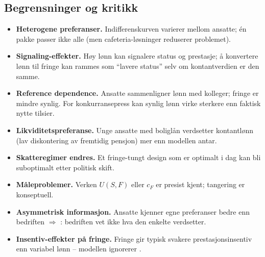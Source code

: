 \subsection*{Begrensninger og kritikk}
\begin{itemize}
\item \textbf{Heterogene preferanser.} Indifferenskurven varierer mellom ansatte; én pakke passer ikke alle (men cafeteria-løsninger reduserer problemet).
\item \textbf{Signaling-effekter.} Høy lønn kan signalere status og prestasje; å konvertere lønn til fringe kan rammes som ``lavere status'' selv om kontantverdien er den samme.
\item \textbf{Reference dependence.} Ansatte sammenligner lønn med kolleger; fringe er mindre synlig. For konkurransepress kan synlig lønn virke sterkere enn faktisk nytte tilsier.
\item \textbf{Likviditetspreferanse.} Unge ansatte med boliglån verdsetter kontantlønn (lav diskontering av fremtidig pensjon) mer enn modellen antar.
\item \textbf{Skatteregimer endres.} Et fringe-tungt design som er optimalt i dag kan bli suboptimalt etter politisk skift.
\item \textbf{Måleproblemer.} Verken $U(S,F)$ eller $c_F$ er presist kjent; tangering er konseptuell.
\item \textbf{Asymmetrisk informasjon.} Ansatte kjenner egne preferanser bedre enn bedriften $\Rightarrow$ : bedriften vet ikke hva den enkelte verdsetter.
\item \textbf{Insentiv-effekter på fringe.} Fringe gir typisk svakere prestasjonsinsentiv enn variabel lønn -- modellen ignorerer .
\end{itemize}

